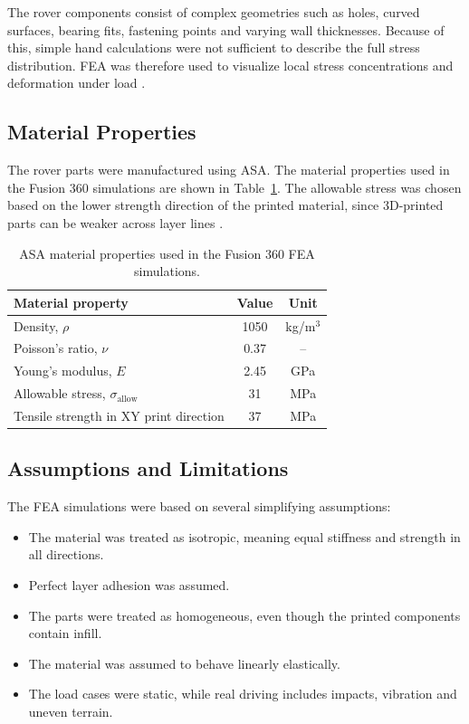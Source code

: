 The rover components consist of complex geometries such as holes, curved surfaces, bearing fits, fastening points and varying wall thicknesses. Because of this, simple hand calculations were not sufficient to describe the full stress distribution. FEA was therefore used to visualize local stress concentrations and deformation under load \cite{Wilcox2020}.
\subsection{Material Properties}

The rover parts were manufactured using ASA. The material properties used in the Fusion 360 simulations are shown in Table~\ref{tab:asa_material_properties}. The allowable stress was chosen based on the lower strength direction of the printed material, since 3D-printed parts can be weaker across layer lines \cite{BambuLabASANEW}.

\begin{table}[H]
\centering
\caption{ASA material properties used in the Fusion 360 FEA simulations.}
\label{tab:asa_material_properties}
\begin{tabular}{l c c}
\hline
Material property & Value & Unit \\
\hline
Density, \(\rho\) & 1050 & kg/m\(^3\) \\
Poisson's ratio, \(\nu\) & 0.37 & -- \\
Young's modulus, \(E\) & 2.45 & GPa \\
Allowable stress, \(\sigma_{\mathrm{allow}}\) & 31 & MPa \\
Tensile strength in XY print direction & 37 & MPa \\
\hline
\end{tabular}
\end{table}

\subsection{Assumptions and Limitations}

The FEA simulations were based on several simplifying assumptions:

\begin{itemize}
    \item The material was treated as isotropic, meaning equal stiffness and strength in all directions.
    \item Perfect layer adhesion was assumed.
    \item The parts were treated as homogeneous, even though the printed components contain infill.
    \item The material was assumed to behave linearly elastically.
    \item The load cases were static, while real driving includes impacts, vibration and uneven terrain.
\end{itemize}

